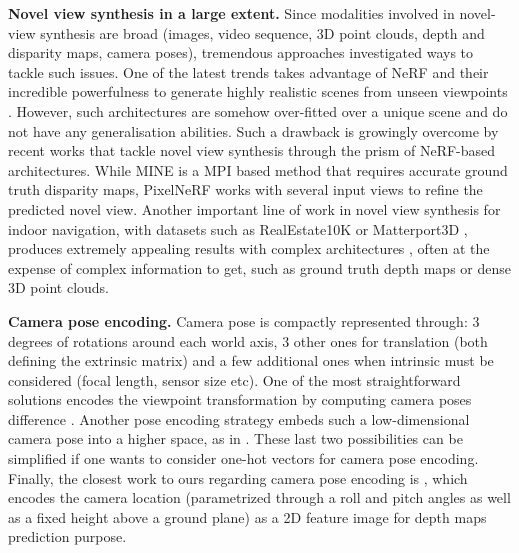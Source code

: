 \noindent\textbf{Novel view synthesis in a large extent.} Since modalities involved in novel-view synthesis are broad (images, video sequence, 3D point clouds, depth and disparity maps, camera poses), tremendous approaches investigated ways to tackle such issues. One of the latest trends takes advantage of \ac{NeRF} \citep{mildenhall2021nerf} and their incredible powerfulness to generate highly realistic scenes from unseen viewpoints \citep{wang2021neus,niemeyer2022regnerf,barron2022mip}. However, such architectures are somehow over-fitted over a unique scene and do not have any generalisation abilities. Such a drawback is growingly overcome by recent works \citep{yu2021pixelnerf,li2021mine} that tackle novel view synthesis through the prism of NeRF-based architectures. While MINE \citep{li2021mine} is a \ac{MPI} based method that requires accurate ground truth disparity maps, PixelNeRF \citep{yu2021pixelnerf} works with several input views to refine the predicted novel view. Another important line of work in novel view synthesis for indoor navigation, with datasets such as RealEstate10K \citep{zhou2018stereo} or Matterport3D \citep{zhao2021camera}, produces extremely appealing results with complex architectures \citep{wiles2020synsin,rombach2021geometry,rockwell2021pixelsynth}, often at the expense of complex information to get, such as ground truth depth maps or dense 3D point clouds. \newline

\noindent\textbf{Camera pose encoding.} Camera pose is compactly represented through: 3 degrees of rotations around each world axis, 3 other ones for translation (both defining the extrinsic matrix) and a few additional ones when intrinsic must be considered (focal length, sensor size etc). One of the most straightforward solutions encodes the viewpoint transformation by computing camera poses difference \citep{sun2018multiview}. Another pose encoding strategy embeds such a low-dimensional camera pose into a higher space, as in \citep{kim2020novel,rombach2021geometry}. These last two possibilities can be simplified if one wants to consider one-hot vectors for camera pose encoding. Finally, the closest work to ours regarding camera pose encoding is \citep{zhao2021camera}, which encodes the camera location (parametrized through a roll and pitch angles as well as a fixed height above a ground plane) as a 2D feature image for depth maps prediction purpose. \newline

